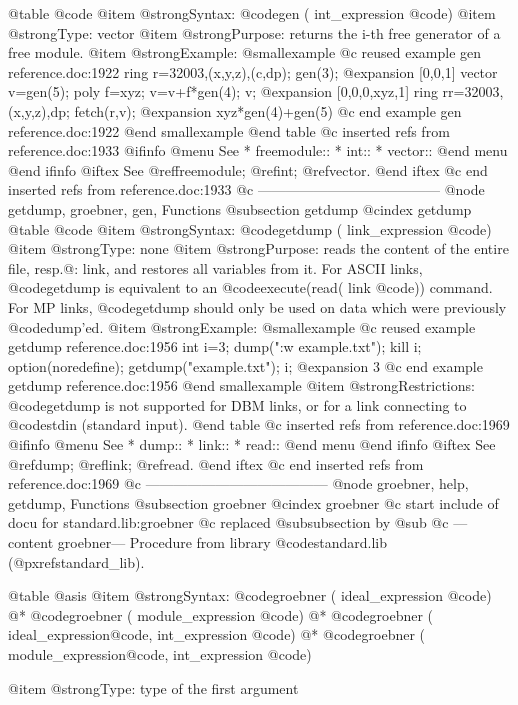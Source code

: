 {@table @code
@item @strong{Syntax:}
@code{gen (} int_expression @code{)}
@item @strong{Type:}
vector
@item @strong{Purpose:}
returns the i-th free generator of a free module.
@item @strong{Example:}
@smallexample
@c reused example gen reference.doc:1922 
  ring r=32003,(x,y,z),(c,dp);
  gen(3);
@expansion{} [0,0,1]
  vector v=gen(5);
  poly f=xyz;
  v=v+f*gen(4); v;
@expansion{} [0,0,0,xyz,1]
  ring rr=32003,(x,y,z),dp;
  fetch(r,v);
@expansion{} xyz*gen(4)+gen(5)
@c end example gen reference.doc:1922
@end smallexample
@end table
@c inserted refs from reference.doc:1933
@ifinfo
@menu
See
* freemodule::
* int::
* vector::
@end menu
@end ifinfo
@iftex
See
@ref{freemodule};
@ref{int};
@ref{vector}.
@end iftex
@c end inserted refs from reference.doc:1933
@c ---------------------------------------
@node getdump, groebner, gen, Functions
@subsection getdump
@cindex getdump
@table @code
@item @strong{Syntax:}
@code{getdump (} link_expression @code{)}
@item @strong{Type:}
none
@item @strong{Purpose:}
reads the content of the entire file, resp.@: link, and restores all variables
from it. For ASCII links, @code{getdump} is equivalent to an
@code{execute(read(} link @code{))} command. For MP links,
@code{getdump} should only be used on data which were previously
@code{dump}'ed.
@item @strong{Example:}
@smallexample
@c reused example getdump reference.doc:1956 
  int i=3;
  dump(":w example.txt");
  kill i;
  option(noredefine);
  getdump("example.txt");
  i;
@expansion{} 3
@c end example getdump reference.doc:1956
@end smallexample
@item @strong{Restrictions:}
@code{getdump} is not supported for DBM links, or for a link connecting
to @code{stdin} (standard input).
@end table
@c inserted refs from reference.doc:1969
@ifinfo
@menu
See
* dump::
* link::
* read::
@end menu
@end ifinfo
@iftex
See
@ref{dump};
@ref{link};
@ref{read}.
@end iftex
@c end inserted refs from reference.doc:1969
@c ---------------------------------------
@node groebner, help, getdump, Functions
@subsection groebner
@cindex groebner
@c start include of docu for standard.lib:groebner
@c replaced @subsubsection by @sub
@c ---content groebner---
Procedure from library @code{standard.lib} (@pxref{standard_lib}).

@table @asis
@item @strong{Syntax:}
@code{groebner (} ideal_expression @code{)} @*
@code{groebner (} module_expression @code{)} @*
@code{groebner (} ideal_expression@code{,} int_expression @code{)} @*
@code{groebner (} module_expression@code{,} int_expression @code{)}

@item @strong{Type:}
type of the first argument

}
